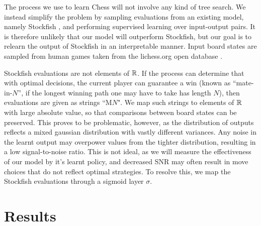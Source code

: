 The process we use to learn Chess will not involve any kind of tree search. We instead simplify the problem by sampling evaluations from an existing model, namely Stockfish \cite{stockfish}, and performing supervised learning over input-output pairs. It is therefore unlikely that our model will outperform Stockfish, but our goal is to relearn the output of Stockfish in an interpretable manner. Input board states are sampled from human games taken from the lichess.org open database \cite{lichess}. 

Stockfish evaluations are not elements of $\mathbb{R}$. If the process can determine that with optimal decisions, the current player can guarantee a win (known as ``mate-in-$N$'', if the longest winning path one may have to take has length $N$), then evaluations are given as strings ``M$N$". We map such strings to elements of $\mathbb{R}$ with large absolute value, so that comparisons between board states can be preserved. This proves to be problematic, however, as the distribution of outputs reflects a mixed gaussian distribution with vastly different variances. Any noise in the learnt output may overpower values from the tighter distribution, resulting in a low signal-to-noise ratio. This is not ideal, as we will measure the effectiveness of our model by it's learnt policy, and decreased SNR may often result in move choices that do not reflect optimal strategies. To resolve this, we map the Stockfish evaluations through a sigmoid layer $\sigma$.

\section{Results}



